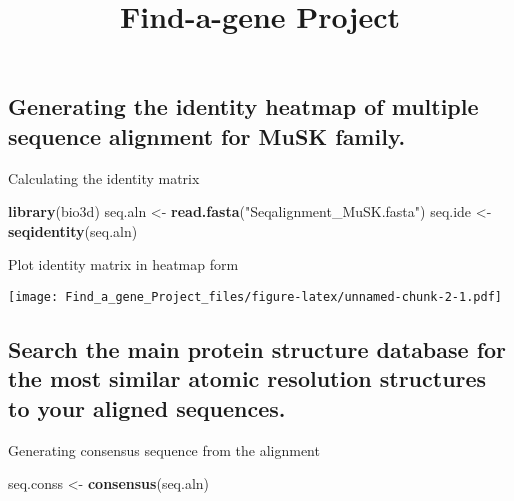 \documentclass[]{article}
\title{Find-a-gene Project}
\author{}
\date{}
\newenvironment{Shaded}{\begin{snugshade}}{\end{snugshade}}
\newcommand{\KeywordTok}[1]{\textcolor[rgb]{0.13,0.29,0.53}{\textbf{#1}}}
\newcommand{\DataTypeTok}[1]{\textcolor[rgb]{0.13,0.29,0.53}{#1}}
\newcommand{\DecValTok}[1]{\textcolor[rgb]{0.00,0.00,0.81}{#1}}
\newcommand{\FloatTok}[1]{\textcolor[rgb]{0.00,0.00,0.81}{#1}}
\newcommand{\StringTok}[1]{\textcolor[rgb]{0.31,0.60,0.02}{#1}}
\newcommand{\OtherTok}[1]{\textcolor[rgb]{0.56,0.35,0.01}{#1}}
\newcommand{\OperatorTok}[1]{\textcolor[rgb]{0.81,0.36,0.00}{\textbf{#1}}}
\newcommand{\NormalTok}[1]{#1}
\begin{document}
\maketitle

\subsection{Generating the identity heatmap of multiple sequence
alignment for MuSK
family.}\label{generating-the-identity-heatmap-of-multiple-sequence-alignment-for-musk-family.}

Calculating the identity matrix

\begin{Shaded}
\begin{Highlighting}[]
\KeywordTok{library}\NormalTok{(bio3d)}
\NormalTok{seq.aln <-}\StringTok{ }\KeywordTok{read.fasta}\NormalTok{(}\StringTok{"Seqalignment_MuSK.fasta"}\NormalTok{)}
\NormalTok{seq.ide <-}\StringTok{ }\KeywordTok{seqidentity}\NormalTok{(seq.aln)}
\end{Highlighting}
\end{Shaded}

Plot identity matrix in heatmap form

\begin{Shaded}
\end{Shaded}

\texttt{[image: Find\_a\_gene\_Project\_files/figure-latex/unnamed-chunk-2-1.pdf]}

\subsection{Search the main protein structure database for the most
similar atomic resolution structures to your aligned
sequences.}\label{search-the-main-protein-structure-database-for-the-most-similar-atomic-resolution-structures-to-your-aligned-sequences.}

Generating consensus sequence from the alignment

\begin{Shaded}
\begin{Highlighting}[]
\NormalTok{seq.conss <-}\StringTok{ }\KeywordTok{consensus}\NormalTok{(seq.aln)}
\end{Highlighting}
\end{Shaded}
\end{document}

